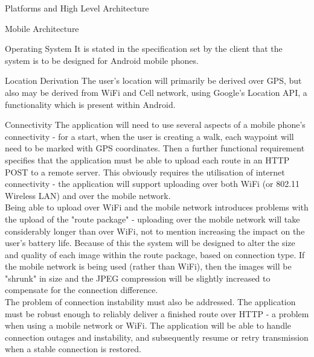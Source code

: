 \documentclass{article}
\begin{document}
	\begin{section}{Platforms and High Level Architecture}
		\begin{subsection}{Mobile Architecture}
			\begin{subsubsection}{Operating System}
				It is stated in the specification set by the client that the system is to be designed for Android mobile phones.
			\end{subsubsection}
			
			\begin{subsubsection}{Location Derivation}
				The user's location will primarily be derived over GPS, but also may be derived from WiFi and Cell network, using Google's Location API, a functionality which is present within Android.
			\end{subsubsection}
			
			\begin{subsubsection}{Connectivity}
				The application will need to use several aspects of a mobile phone's connectivity - for a start, when the user is creating a walk, each waypoint will need to be marked with GPS coordinates. Then a further functional requirement specifies that the application must be able to upload each route in an HTTP POST to a remote server. This obviously requires the utilisation of internet connectivity - the application will support uploading over both WiFi (or 802.11 Wireless LAN) and over the mobile network. \\
				
				Being able to upload over WiFi and the mobile network introduces problems with the upload of the "route package" - uploading over the mobile network will take considerably longer than over WiFi, not to mention increasing the impact on the user's battery life. Because of this the system will be designed to alter the size and quality of each image within the route package, based on connection type. If the mobile network is being used (rather than WiFi), then the images will be "shrunk" in size and the JPEG compression will be slightly increased to compensate for the connection difference. \\
				
				The problem of connection instability must also be addressed. The application must be robust enough to reliably deliver a finished route over HTTP - a problem when using a mobile network or WiFi. The application will be able to handle connection outages and instability, and subsequently resume or retry transmission when a stable connection is restored.
			\end{subsubsection}
			

\end{subsection}
\end{section}
\end{document}
